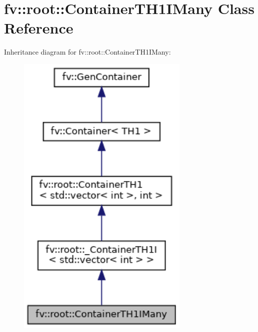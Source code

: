 \hypertarget{classfv_1_1root_1_1ContainerTH1IMany}{}\section{fv\+:\+:root\+:\+:Container\+T\+H1\+I\+Many Class Reference}
\label{classfv_1_1root_1_1ContainerTH1IMany}


Inheritance diagram for fv\+:\+:root\+:\+:Container\+T\+H1\+I\+Many\+:
\nopagebreak
\begin{figure}[H]
\begin{center}
\leavevmode
\includegraphics[width=233pt]{classfv_1_1root_1_1ContainerTH1IMany__inherit__graph}
\end{center}
\end{figure}


